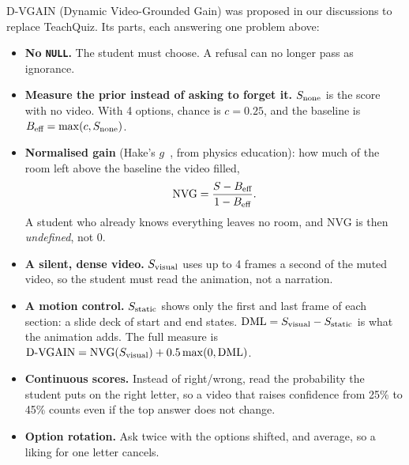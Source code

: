 \documentclass[11pt]{article}
\begin{document}
D-VGAIN (Dynamic Video-Grounded Gain) was proposed in our discussions to replace TeachQuiz. Its parts, each
answering one problem above:
\begin{itemize}
  \item \textbf{No \texttt{NULL}.} The student must choose. A refusal can no longer pass as ignorance.
  \item \textbf{Measure the prior instead of asking to forget it.} $S_{\text{none}}$ is the score with no video. With 4
  options, chance is $c = 0.25$, and the baseline is $B_{\text{eff}} = \max(c, S_{\text{none}})$.
  \item \textbf{Normalised gain} (Hake's $g$~\cite{hake1998}, from physics education): how much of the room left
  above the baseline the video filled,
  \[ \mathrm{NVG} = \frac{S - B_{\text{eff}}}{1 - B_{\text{eff}}}. \]
  A student who already knows everything leaves no room, and NVG is then \emph{undefined}, not 0.
  \item \textbf{A silent, dense video.} $S_{\text{visual}}$ uses up to 4 frames a second of the muted video, so the student
  must read the animation, not a narration.
  \item \textbf{A motion control.} $S_{\text{static}}$ shows only the first and last frame of each section: a slide deck of
  start and end states. $\mathrm{DML} = S_{\text{visual}} - S_{\text{static}}$ is what the animation adds. The full measure is
  $\text{D-VGAIN} = \mathrm{NVG}(S_{\text{visual}}) + 0.5 \max(0, \mathrm{DML})$.
  \item \textbf{Continuous scores.} Instead of right/wrong, read the probability the student puts on the right letter,
  so a video that raises confidence from 25\% to 45\% counts even if the top answer does not change.
  \item \textbf{Option rotation.} Ask twice with the options shifted, and average, so a liking for one letter cancels.
\end{itemize}
\end{document}
